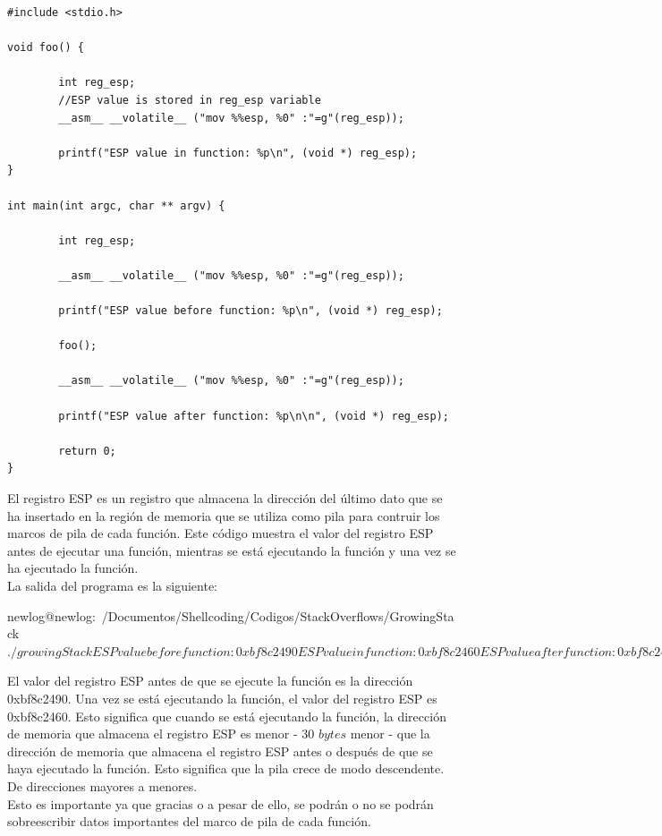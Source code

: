 \documentclass [titlepage, 12pt]{article}
\begin{document}
\lstset{language=C++,caption=Obteniendo el valor del registro ESP}
\begin{lstlisting}
#include <stdio.h>

void foo() {

        int reg_esp;
        //ESP value is stored in reg_esp variable
        __asm__ __volatile__ ("mov %%esp, %0" :"=g"(reg_esp));

        printf("ESP value in function: %p\n", (void *) reg_esp);
}

int main(int argc, char ** argv) {

        int reg_esp;

        __asm__ __volatile__ ("mov %%esp, %0" :"=g"(reg_esp));

        printf("ESP value before function: %p\n", (void *) reg_esp);

        foo();

        __asm__ __volatile__ ("mov %%esp, %0" :"=g"(reg_esp));

        printf("ESP value after function: %p\n\n", (void *) reg_esp);

        return 0;
}
\end{lstlisting}

El registro ESP es un registro que almacena la direcci\'on del \'ultimo dato que se ha insertado en la regi\'on de memoria que se utiliza como pila para contruir los marcos de pila de cada funci\'on. Este c\'odigo muestra el valor del registro ESP antes de ejecutar una funci\'on, mientras se est\'a ejecutando la funci\'on y una vez se ha ejecutado la funci\'on.\\
La salida del programa es la siguiente:

\begin{listing}[style=consola, numbers=none, caption=Valor del registro ESP]	
newlog@newlog:~/Documentos/Shellcoding/Codigos/StackOverflows/GrowingStack$ ./growingStack 
ESP value before function: 0xbf8c2490
ESP value in function: 0xbf8c2460
ESP value after function: 0xbf8c2490
newlog@newlog:~/Documentos/Shellcoding/Codigos/StackOverflows/GrowingStack$ 
\end{listing}

El valor del registro ESP antes de que se ejecute la funci\'on es la direcci\'on 0xbf8c2490. Una vez se est\'a ejecutando la funci\'on, el valor del registro ESP es 0xbf8c2460. Esto significa que cuando se est\'a ejecutando la funci\'on, la direcci\'on de memoria que almacena el registro ESP es menor - 30 $bytes$ menor - que la direcci\'on de memoria que almacena el registro ESP antes o despu\'es de que se haya ejecutado la funci\'on. Esto significa que la pila crece de modo descendente. De direcciones mayores a menores.\\
Esto es importante ya que gracias o a pesar de ello, se podr\'an o no se podr\'an sobreescribir datos importantes del marco de pila de cada funci\'on. 
\end{document}
